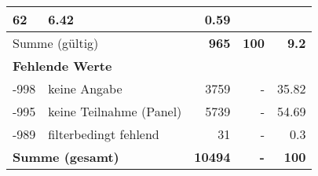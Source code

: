 \begin{longtable}{lXrrr}
       \num{62} &
       \num[round-mode=places,round-precision=2]{6.42} &
         \num[round-mode=places,round-precision=2]{0.59} \\
     \midrule
     \multicolumn{2}{l}{Summe (gültig)} &
       \textbf{\num{965}} &
     \textbf{\num{100}} &
       \textbf{\num[round-mode=places,round-precision=2]{9.2}} \\
     \multicolumn{5}{l}{\textbf{Fehlende Werte}}\\
       -998 &
       keine Angabe &
         \num{3759} &
        - &
         \num[round-mode=places,round-precision=2]{35.82} \\
       -995 &
       keine Teilnahme (Panel) &
         \num{5739} &
        - &
         \num[round-mode=places,round-precision=2]{54.69} \\
       -989 &
       filterbedingt fehlend &
         \num{31} &
        - &
         \num[round-mode=places,round-precision=2]{0.3} \\
     \midrule
     \multicolumn{2}{l}{\textbf{Summe (gesamt)}} &
          \textbf{\num{10494}} &
        \textbf{-} &
        \textbf{\num{100}} \\
     \bottomrule
     \end{longtable}
     
